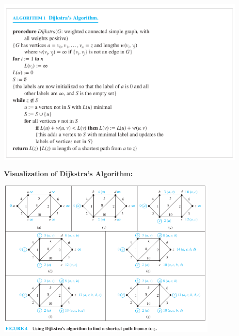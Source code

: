 \documentclass[aspectratio=169]{beamer}
\begin{document}
\begin{frame}[plain]{}

  \begin{center}
     \includegraphics[height=8.5cm]{./img/lecture7-fig2.png}
  \end{center}
  
\end{frame}

\begin{frame}[plain]{}

 {\bf Visualization of Dijkstra's Algorithm:}
  \begin{center}
     \includegraphics[height=8cm]{./img/lecture7-fig3.png}
  \end{center}
  
\end{frame}
\end{document}
